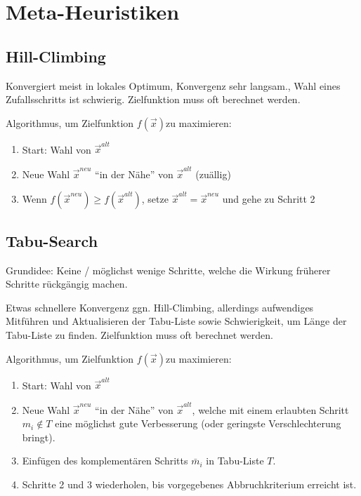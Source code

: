 \section{Meta-Heuristiken}
\subsection{Hill-Climbing }
  Konvergiert meist in lokales Optimum, Konvergenz sehr langsam., Wahl eines Zufallsschritts ist schwierig. Zielfunktion muss oft berechnet werden.
  
  Algorithmus, um Zielfunktion $f(\vec{x})$zu maximieren:
  \begin{enumerate}
    \item Start: Wahl von $\vec{x}^{alt}$
    \item Neue Wahl $\vec{x}^{neu}$ "`in der Nähe"' von $\vec{x}^{alt}$ (zuällig)%
    \item Wenn $f(\vec{x}^{neu}) \geq f(\vec{x}^{alt})$, setze $\vec{x}^{alt} = \vec{x}^{neu}$ und gehe zu Schritt 2
  \end{enumerate}
  
 

\subsection{Tabu-Search }
  Grundidee: Keine / möglichst wenige Schritte, welche die Wirkung früherer Schritte rückgängig machen.
  
  Etwas schnellere Konvergenz ggn. Hill-Climbing, allerdings aufwendiges Mitführen und Aktualisieren der Tabu-Liste sowie Schwierigkeit, um Länge der Tabu-Liste zu finden. Zielfunktion muss oft berechnet werden.
  
  Algorithmus, um Zielfunktion $f(\vec{x})$zu maximieren:
  \begin{enumerate}
    \item Start: Wahl von $\vec{x}^{alt}$
    \item Neue Wahl $\vec{x}^{neu}$ "`in der Nähe"' von $\vec{x}^{alt}$, welche mit einem erlaubten Schritt $m_i \notin T$ eine möglichst gute Verbesserung (oder geringste Verschlechterung bringt).
    \item Einfügen des komplementären Schritts $\bar{m}_i$ in Tabu-Liste $T$.
    \item Schritte 2 und 3 wiederholen, bis vorgegebenes Abbruchkriterium erreicht ist.
  \end{enumerate}

